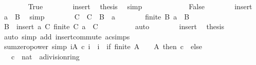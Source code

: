 \begin{isabellebody}
\ \ \ \ \ \ \isamarkupfalse%
\ True\isanewline
\ \ \ \ \ \ \isamarkupfalse%
\ insert\ \isamarkupfalse%
\ {\isacharquery}{\kern0pt}thesis\ \isamarkupfalse%
\ simp\isanewline
\ \ \ \ \isamarkupfalse%
\isanewline
\ \ \ \ \ \ \isamarkupfalse%
\ False\isanewline
\ \ \ \ \ \ \isamarkupfalse%
\ insert\ \isamarkupfalse%
\ {\isachardoublequoteopen}a\ {\isasymin}\ B{\isachardoublequoteclose}\ \isamarkupfalse%
\ simp\isanewline
\ \ \ \ \ \ \isamarkupfalse%
\ C\ \ {\isachardoublequoteopen}C\ {\isacharequal}{\kern0pt}\ B\ {\isacharminus}{\kern0pt}\ {\isacharbraceleft}{\kern0pt}a{\isacharbraceright}{\kern0pt}{\isachardoublequoteclose}\isanewline
\ \ \ \ \ \ \isamarkupfalse%
\ {\isacartoucheopen}finite\ B{\isacartoucheclose}\ {\isacartoucheopen}a\ {\isasymin}\ B{\isacartoucheclose}\ \isamarkupfalse%
\ {\isachardoublequoteopen}B\ {\isacharequal}{\kern0pt}\ insert\ a\ C{\isachardoublequoteclose}\ {\isachardoublequoteopen}finite\ C{\isachardoublequoteclose}\ {\isachardoublequoteopen}a\ {\isasymnotin}\ C{\isachardoublequoteclose}\isanewline
\ \ \ \ \ \ \ \ \isamarkupfalse%
\ auto\isanewline
\ \ \ \ \ \ \isamarkupfalse%
\ insert\ \isamarkupfalse%
\ {\isacharquery}{\kern0pt}thesis\isanewline
\ \ \ \ \ \ \ \ \isamarkupfalse%
\ {\isacharparenleft}{\kern0pt}auto\ simp\ add{\isacharcolon}{\kern0pt}\ insert{\isacharunderscore}{\kern0pt}commute\ ac{\isacharunderscore}{\kern0pt}simps{\isacharparenright}{\kern0pt}\isanewline
\ \ \ \ \isamarkupfalse%
\isanewline
\ \ \isamarkupfalse%
\isanewline
{}\isamarkupfalse%
%
\endisatagproof
{\isafoldproof}%
%
\isadelimproof
\isanewline
%
\endisadelimproof
\isanewline
{}\isamarkupfalse%
\ sum{\isacharunderscore}{\kern0pt}zero{\isacharunderscore}{\kern0pt}power\ {\isacharbrackleft}{\kern0pt}simp{\isacharbrackright}{\kern0pt}{\isacharcolon}{\kern0pt}\ {\isachardoublequoteopen}{\isacharparenleft}{\kern0pt}{\isasymSum}i{\isasymin}A{\isachardot}{\kern0pt}\ c\ i\ {\isacharasterisk}{\kern0pt}\ {}{\isacharcircum}{\kern0pt}i{\isacharparenright}{\kern0pt}\ {\isacharequal}{\kern0pt}\ {\isacharparenleft}{\kern0pt}if\ finite\ A\ {\isasymand}\ {}\ {\isasymin}\ A\ then\ c\ {}\ else\ {}{\isacharparenright}{\kern0pt}{\isachardoublequoteclose}\isanewline
\ \ \ c\ {\isacharcolon}{\kern0pt}{\isacharcolon}{\kern0pt}\ {\isachardoublequoteopen}nat\ {\isasymRightarrow}\ {\isacharprime}{\kern0pt}a{\isacharcolon}{\kern0pt}{\isacharcolon}{\kern0pt}division{\isacharunderscore}{\kern0pt}ring{\isachardoublequoteclose}\isanewline

\end{isabellebody}
